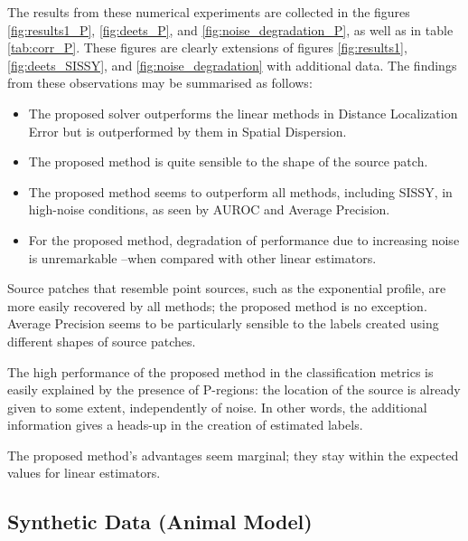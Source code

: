 The results from these numerical experiments are collected in the
figures \ref{fig:results1_P}, \ref{fig:deets_P}, and \ref{fig:noise_degradation_P}, as well as in table \ref{tab:corr_P}.
%
These figures are clearly extensions of figures
\ref{fig:results1}, \ref{fig:deets_SISSY}, and \ref{fig:noise_degradation} with additional data.
%
%
The findings from these observations may be summarised as follows:
\begin{itemize}
    \item The proposed solver outperforms the linear methods in Distance Localization Error but is outperformed by them in Spatial Dispersion.
    \item The proposed method is quite sensible to the shape of the source patch. 
    \item The proposed method seems to outperform all methods, including SISSY, in high-noise conditions, as seen by AUROC and Average Precision.
    \item For the proposed method, degradation of performance due to increasing noise is unremarkable --when compared with other linear estimators.
\end{itemize}

Source patches that resemble point sources, such as the exponential profile, are more easily recovered by all methods; the proposed method is no exception.
%
Average Precision seems to be particularly sensible to the labels created using different shapes of source patches.

The high performance of the proposed method in the classification metrics is easily explained by the presence of P-regions: the location of the source is already given to some extent, independently of noise.
%
In other words, the additional information gives a heads-up in the creation of estimated labels.

The proposed method's advantages seem marginal; they stay within the expected values for linear estimators.

\subsection{Synthetic Data (Animal Model)}

%
%

